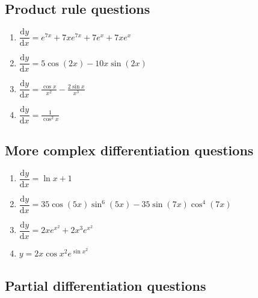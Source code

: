 \documentclass[
]{book}
\providecommand{\tightlist}{%
  \setlength{\itemsep}{0pt}\setlength{\parskip}{0pt}}
\begin{document}
\hypertarget{product-rule-questions-1}{%
\subsection{Product rule questions}\label{product-rule-questions-1}}

\begin{enumerate}
\def\labelenumi{\arabic{enumi}.}
\tightlist
\item
  \(\dfrac{\textrm{d}y}{\textrm{d}x}=e^{7x}+7xe^{7x}+ 7e^x+7xe^x\)
\item
  \(\dfrac{\textrm{d}y}{\textrm{d}x}=5 \cos (2x)-10x \sin (2x)\)
\item
  \(\dfrac{\textrm{d}y}{\textrm{d}x}= \frac{\cos x}{x^2}-\frac{2\sin x}{x^3}\)
\item
  \(\dfrac{\textrm{d}y}{\textrm{d}x}=\frac{1}{\cos^2 x}\)
\end{enumerate}

\hypertarget{more-complex-differentiation-questions-1}{%
\subsection{More complex differentiation questions}\label{more-complex-differentiation-questions-1}}

\begin{enumerate}
\def\labelenumi{\arabic{enumi}.}
\tightlist
\item
  \(\dfrac{\textrm{d}y}{\textrm{d}x}=\ln x +1\)
\item
  \(\dfrac{\textrm{d}y}{\textrm{d}x}=35 \cos (5x) \sin^6 (5x) - 35 \sin (7x) \cos^4(7x)\)
\item
  \(\dfrac{\textrm{d}y}{\textrm{d}x}=2x e^{x^2}+ 2x^3e^{x^2}\)
\item
  \(y=2x \cos x^2 e^{\sin x^2}\)
\end{enumerate}

\hypertarget{partial-differentiation-questions-1}{%
\subsection{Partial differentiation questions}\label{partial-differentiation-questions-1}}
\end{document}
